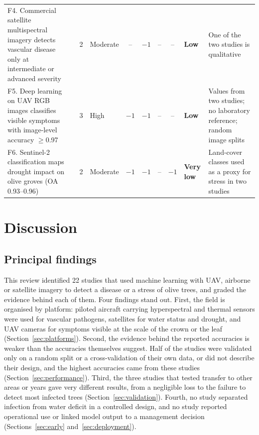 \documentclass[preprint,12pt]{elsarticle}
\begin{document}
\begin{landscape}
\begin{longtable}{@{}L{3.9cm}L{2.6cm}cL{1.3cm}ccccL{1.6cm}L{2.9cm}@{}}
F4. Commercial satellite multispectral imagery detects vascular disease only at intermediate or advanced severity & \citet{u056,kallel2022olive} & 2 & Moderate & -- & $-1$ & -- & -- & \textbf{Low} & One of the two studies is qualitative\\
F5. Deep learning on UAV RGB images classifies visible symptoms with image-level accuracy $\geq$0.97 & \citet{u046,u055,u080} & 3 & High & $-1$ & $-1$ & -- & -- & \textbf{Low} & Values from two studies; no laboratory reference; random image splits\\
F6. Sentinel-2 classification maps drought impact on olive groves (OA 0.93--0.96) & \citet{u105,u138,u135} & 2 & Moderate & $-1$ & $-1$ & -- & $-1$ & \textbf{Very low} & Land-cover classes used as a proxy for stress in two studies\\
\end{longtable}
\end{landscape}
\section{Discussion}\label{sec:discussion}

\subsection{Principal findings}\label{sec:disc_main}
This review identified 22 studies that used machine learning with UAV, airborne or satellite imagery to detect a disease or a stress of olive trees, and graded the evidence behind each of them. Four findings stand out. First, the field is organised by platform: piloted aircraft carrying hyperspectral and thermal sensors were used for vascular pathogens, satellites for water status and drought, and UAV cameras for symptoms visible at the scale of the crown or the leaf (Section~\ref{sec:platforms}). Second, the evidence behind the reported accuracies is weaker than the accuracies themselves suggest. Half of the studies were validated only on a random split or a cross-validation of their own data, or did not describe their design, and the highest accuracies came from these studies (Section~\ref{sec:performance}). Third, the three studies that tested transfer to other areas or years gave very different results, from a negligible loss to the failure to detect most infected trees (Section~\ref{sec:validation}). Fourth, no study separated infection from water deficit in a controlled design, and no study reported operational use or linked model output to a management decision (Sections~\ref{sec:early} and~\ref{sec:deployment}).
\end{document}
